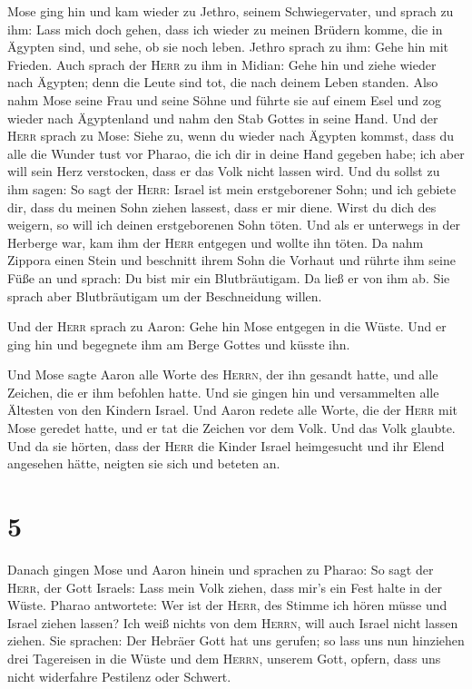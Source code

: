  Mose ging hin und kam wieder zu Jethro, seinem
Schwiegervater, und sprach zu ihm: Lass mich doch gehen, dass ich wieder
zu meinen Brüdern komme, die in Ägypten sind, und sehe, ob sie noch
leben. Jethro sprach zu ihm: Gehe hin mit Frieden.  Auch
sprach der \textsc{Herr} zu ihm in Midian: Gehe hin und ziehe wieder
nach Ägypten; denn die Leute sind tot, die nach deinem Leben standen.
 Also nahm Mose seine Frau und seine Söhne und führte sie
auf einem Esel und zog wieder nach Ägyptenland und nahm den Stab Gottes
in seine Hand.  Und der \textsc{Herr} sprach zu Mose:
Siehe zu, wenn du wieder nach Ägypten kommst, dass du alle die Wunder
tust vor Pharao, die ich dir in deine Hand gegeben habe; ich aber will
sein Herz verstocken, dass er das Volk nicht lassen wird.
 Und du sollst zu ihm sagen: So sagt der \textsc{Herr}:
Israel ist mein erstgeborener Sohn;  und ich gebiete dir,
dass du meinen Sohn ziehen lassest, dass er mir diene. Wirst du dich des
weigern, so will ich deinen erstgeborenen Sohn töten. 
Und als er unterwegs in der Herberge war, kam ihm der \textsc{Herr}
entgegen und wollte ihn töten.  Da nahm Zippora einen
Stein und beschnitt ihrem Sohn die Vorhaut und rührte ihm seine Füße an
und sprach: Du bist mir ein Blutbräutigam.  Da ließ er
von ihm ab. Sie sprach aber Blutbräutigam um der Beschneidung willen.

 Und der \textsc{Herr} sprach zu Aaron: Gehe hin Mose
entgegen in die Wüste. Und er ging hin und begegnete ihm am Berge Gottes
und küsste ihn.

 Und Mose sagte Aaron alle Worte des \textsc{Herrn}, der
ihn gesandt hatte, und alle Zeichen, die er ihm befohlen hatte.
 Und sie gingen hin und versammelten alle Ältesten von
den Kindern Israel.  Und Aaron redete alle Worte, die der
\textsc{Herr} mit Mose geredet hatte, und er tat die Zeichen vor dem
Volk.  Und das Volk glaubte. Und da sie hörten, dass der
\textsc{Herr} die Kinder Israel heimgesucht und ihr Elend angesehen
hätte, neigten sie sich und beteten an.

\hypertarget{section-4}{%
\section{5}\label{section-4}}

 Danach gingen Mose und Aaron hinein und sprachen zu
Pharao: So sagt der \textsc{Herr}, der Gott Israels: Lass mein Volk
ziehen, dass mir's ein Fest halte in der Wüste.  Pharao
antwortete: Wer ist der \textsc{Herr}, des Stimme ich hören müsse und
Israel ziehen lassen? Ich weiß nichts von dem \textsc{Herrn}, will auch
Israel nicht lassen ziehen.  Sie sprachen: Der Hebräer
Gott hat uns gerufen; so lass uns nun hinziehen drei Tagereisen in die
Wüste und dem \textsc{Herrn}, unserem Gott, opfern, dass uns nicht
widerfahre Pestilenz oder Schwert.

